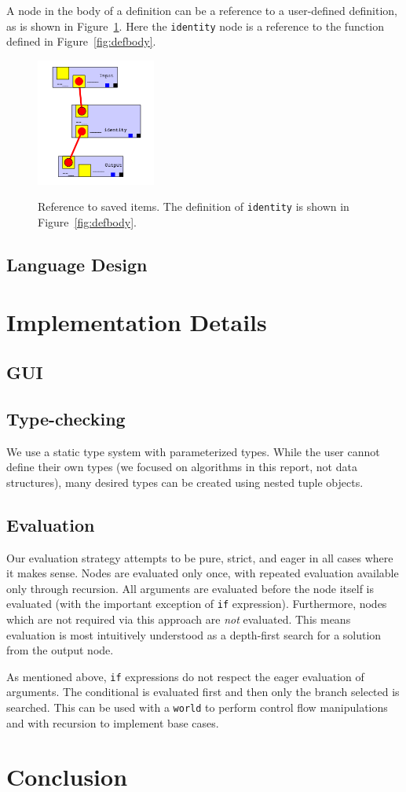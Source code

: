 \documentclass[12pt,UTF8,a4]{article}
\newcommand{\code}[1]{\texttt{#1}}
\begin{document}
A node in the body of a definition can be a reference to a user-defined definition, as is shown in Figure~\ref{fig:ref}. Here the \code{identity} node is a reference to the function defined in Figure~\ref{fig:defbody}.
\begin{figure}[h]
\center
\includegraphics[width=0.35\textwidth]{./images/ref} \\
\caption{Reference to saved items. The definition of \code{identity} is shown in Figure~\ref{fig:defbody}.}\label{fig:ref}
\end{figure}

\subsection{Language Design}
\section{Implementation Details}
\subsection{GUI}
\subsection{Type-checking}
We use a static type system with parameterized types. While the user cannot define their own types (we focused on algorithms in this report, not data structures), many desired types can be created using nested tuple objects.

\subsection{Evaluation}
Our evaluation strategy attempts to be pure, strict, and eager in all cases where it makes sense. Nodes are evaluated only once, with repeated evaluation available only through recursion. All arguments are evaluated before the node itself is evaluated (with the important exception of \code{if} expression). Furthermore, nodes which are not required via this approach are {\em not} evaluated. This means evaluation is most intuitively understood as a depth-first search for a solution from the output node.

As mentioned above, \code{if} expressions do not respect the eager evaluation of arguments. The conditional is evaluated first and then only the branch selected is searched. This can be used with a \code{world} to perform control flow manipulations and with recursion to implement base cases.
\section{Conclusion}
\end{document}
